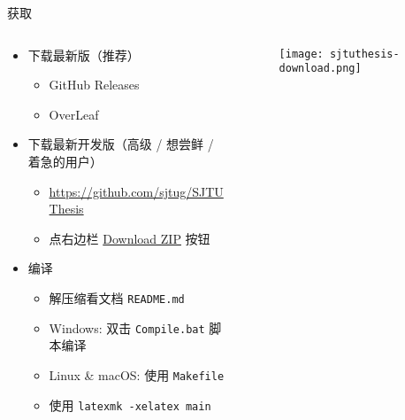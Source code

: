 \begin{frame}[fragile]{获取\SJTUThesis{}}
  \begin{columns}
    \begin{column}{.65\textwidth}
      \begin{itemize}
        \item 下载最新版（推荐）
              \begin{itemize}
                \item GitHub Releases 
                \item OverLeaf
              \end{itemize}
        \item 下载最新开发版（高级 / 想尝鲜 / 着急的用户）
              \begin{itemize}
                \item \url{https://github.com/sjtug/SJTUThesis}
                \item 点右边栏
                      \href{https://github.com/sjtug/SJTUThesis/archive/dev.zip}{Download ZIP} 按钮
              \end{itemize}
        \item 编译
              \begin{itemize}
                \item 解压缩看文档 \verb|README.md|
                \item Windows: 双击 \verb|Compile.bat| 脚本编译
                \item Linux \& macOS: 使用 \verb|Makefile|
                \item 使用 \verb|latexmk -xelatex main|
              \end{itemize}
      \end{itemize}
    \end{column}
    \begin{column}{.25\textwidth}
      \begin{figure}[htbp]
        \centering
        \texttt{[image: sjtuthesis-download.png]}
      \end{figure}
      \vfill
    \end{column}
  \end{columns}
\end{frame}

